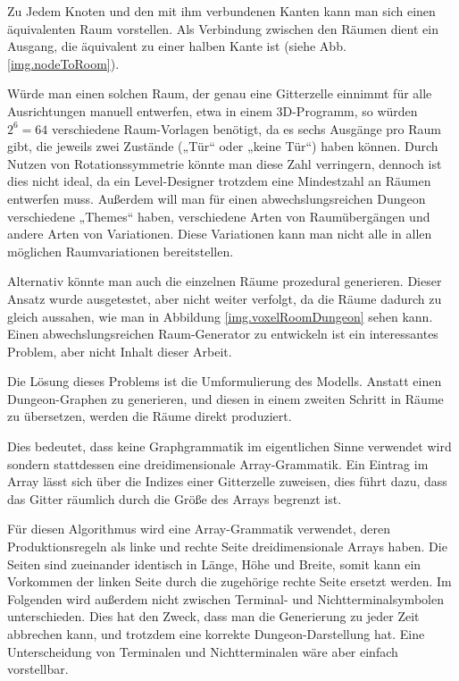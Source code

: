 
Zu Jedem Knoten und den mit ihm verbundenen Kanten kann man sich einen äquivalenten Raum vorstellen. Als Verbindung zwischen den Räumen dient ein Ausgang, die äquivalent zu einer halben Kante ist (siehe Abb. \ref{img.nodeToRoom}).


Würde man einen solchen Raum, der genau eine Gitterzelle einnimmt für alle Ausrichtungen manuell entwerfen, etwa in einem 3D-Programm, so würden $ 2^6 = 64 $ verschiedene Raum-Vorlagen benötigt, da es sechs Ausgänge pro Raum gibt, die jeweils zwei Zustände („Tür“ oder „keine Tür“) haben können. Durch Nutzen von Rotationssymmetrie könnte man diese Zahl verringern, dennoch ist dies nicht ideal, da ein Level-Designer trotzdem eine Mindestzahl an Räumen entwerfen muss. Außerdem will man für einen abwechslungsreichen Dungeon verschiedene „Themes“ haben, verschiedene Arten von Raumübergängen und andere Arten von Variationen. Diese Variationen kann man nicht alle in allen möglichen Raumvariationen bereitstellen. 

Alternativ könnte man auch die einzelnen Räume prozedural generieren. Dieser Ansatz wurde ausgetestet, aber nicht weiter verfolgt, da die Räume dadurch zu gleich aussahen, wie man in Abbildung \ref{img.voxelRoomDungeon} sehen kann. Einen abwechslungsreichen Raum-Generator zu entwickeln ist ein interessantes Problem, aber nicht Inhalt dieser Arbeit.


Die Lösung dieses Problems ist die Umformulierung des Modells. Anstatt einen Dungeon-Graphen zu generieren, und diesen in einem zweiten Schritt in Räume zu übersetzen, werden die Räume direkt produziert. 

Dies bedeutet, dass keine Graphgrammatik im eigentlichen Sinne verwendet wird sondern stattdessen eine dreidimensionale Array-Grammatik. Ein Eintrag im Array lässt sich über die Indizes einer Gitterzelle zuweisen, dies führt dazu, dass das Gitter räumlich durch die Größe des Arrays begrenzt ist.

Für diesen Algorithmus wird eine Array-Grammatik verwendet, deren Produktionsregeln als linke und rechte Seite dreidimensionale Arrays haben. Die Seiten sind zueinander identisch in Länge, Höhe und Breite, somit kann ein Vorkommen der linken Seite durch die zugehörige rechte Seite ersetzt werden. Im Folgenden wird außerdem nicht zwischen Terminal- und Nichtterminalsymbolen unterschieden. Dies hat den Zweck, dass man die Generierung zu jeder Zeit abbrechen kann, und trotzdem eine korrekte Dungeon-Darstellung hat. Eine Unterscheidung von Terminalen und Nichtterminalen wäre aber einfach vorstellbar.

